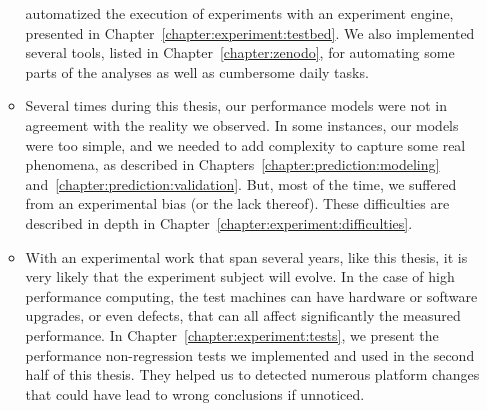 \begin{itemize}
\begin{itemize}
                        automatized the execution of experiments with an experiment engine, presented in
                        Chapter~\ref{chapter:experiment:testbed}. We also implemented several tools, listed in
                        Chapter~\ref{chapter:zenodo}, for automating some parts of the analyses as well as cumbersome
                        daily tasks.
                    \item Several times during this thesis, our performance models were not in agreement with the
                        reality we observed. In some instances, our models were too simple, and we needed to add
                        complexity to capture some real phenomena, as described in
                        Chapters~\ref{chapter:prediction:modeling} and~\ref{chapter:prediction:validation}. But, most of
                        the time, we suffered from an experimental bias (or the lack thereof). These difficulties are
                        described in depth in Chapter~\ref{chapter:experiment:difficulties}.
                    \item With an experimental work that span several years, like this thesis, it is very likely that the
                        experiment subject will evolve. In the case of high performance computing, the test machines can
                        have hardware or software upgrades, or even defects, that can all affect significantly the
                        measured performance. In Chapter~\ref{chapter:experiment:tests}, we present the performance
                        non-regression tests we implemented and used in the second half of this thesis. They helped us
                        to detected numerous platform changes that could have lead to wrong conclusions if unnoticed.
                \end{itemize}
        \end{itemize}



